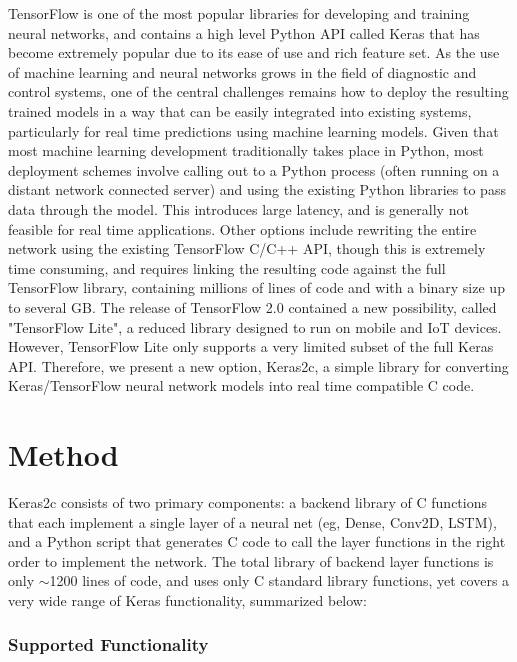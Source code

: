 \documentclass{article}
\begin{document}
TensorFlow is one of the most popular libraries for developing and
training neural networks, and contains a high level Python API called
Keras that has become extremely popular due to its ease of use and rich
feature set. As the use of machine learning and neural networks grows in
the field of diagnostic and control systems, one of the central
challenges remains how to deploy the resulting trained models in a way
that can be easily integrated into existing systems, particularly for
real time predictions using machine learning models. Given that most
machine learning development traditionally takes place in Python, most
deployment schemes involve calling out to a Python process (often
running on a distant network connected server) and using the existing
Python libraries to pass data through the model. This introduces large
latency, and is generally not feasible for real time applications. Other
options include rewriting the entire network using the existing
TensorFlow C/C++ API, though this is extremely time consuming, and
requires linking the resulting code against the full TensorFlow library,
containing millions of lines of code and with a binary size up to
several GB. The release of TensorFlow 2.0 contained a new possibility,
called "TensorFlow Lite", a reduced library designed to run on mobile
and IoT devices. However, TensorFlow Lite only supports a very limited
subset of the full Keras API. Therefore, we present a new option,
Keras2c, a simple library for converting Keras/TensorFlow neural network
models into real time compatible C code.


\section*{Method}\label{method}



Keras2c consists of two primary components: a backend library of C
functions that each implement a single layer of a neural net (eg, Dense,
Conv2D, LSTM), and a Python script that generates C code to call the
layer functions in the right order to implement the network. The total
library of backend layer functions is only $\sim$1200 lines
of code, and uses only C standard library functions, yet covers a very
wide range of Keras functionality, summarized below:



\subsubsection*{Supported Functionality}\label{supported-layers}
\end{document}
